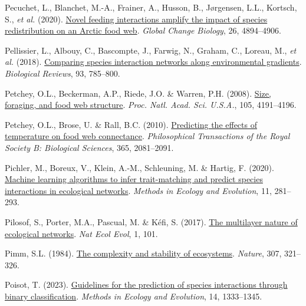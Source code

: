 \documentclass[
]{article}
\newlength{\cslhangindent}
\newenvironment{CSLReferences}[2] %
 {\begin{list}{}{%
  \setlength{\itemindent}{0pt}
  \setlength{\leftmargin}{0pt}
  \setlength{\parsep}{0pt}
  \ifodd #1
   \setlength{\leftmargin}{\cslhangindent}
   \setlength{\itemindent}{-1\cslhangindent}
  \fi
  \setlength{\itemsep}{#2\baselineskip}}}
 {\end{list}}
\begin{document}
\begin{CSLReferences}{1}{0}
Pecuchet, L., Blanchet, M.-A., Frainer, A., Husson, B., Jørgensen, L.L.,
Kortsch, S., \emph{et al.} (2020).
\href{https://doi.org/10.1111/gcb.15196}{Novel feeding interactions
amplify the impact of species redistribution on an {Arctic} food web}.
\emph{Global Change Biology}, 26, 4894--4906.

Pellissier, L., Albouy, C., Bascompte, J., Farwig, N., Graham, C.,
Loreau, M., \emph{et al.} (2018).
\href{https://doi.org/10.1111/brv.12366}{Comparing species interaction
networks along environmental gradients}. \emph{Biological Reviews}, 93,
785--800.

Petchey, O.L., Beckerman, A.P., Riede, J.O. \& Warren, P.H. (2008).
\href{https://doi.org/10.1073/pnas.0710672105}{Size, foraging, and food
web structure}. \emph{Proc. Natl. Acad. Sci. U.S.A.}, 105, 4191--4196.

Petchey, O.L., Brose, U. \& Rall, B.C. (2010).
\href{https://doi.org/10.1098/rstb.2010.0011}{Predicting the effects of
temperature on food web connectance}. \emph{Philosophical Transactions
of the Royal Society B: Biological Sciences}, 365, 2081--2091.

Pichler, M., Boreux, V., Klein, A.-M., Schleuning, M. \& Hartig, F.
(2020). \href{https://doi.org/10.1111/2041-210X.13329}{Machine learning
algorithms to infer trait-matching and predict species interactions in
ecological networks}. \emph{Methods in Ecology and Evolution}, 11,
281--293.

Pilosof, S., Porter, M.A., Pascual, M. \& Kéfi, S. (2017).
\href{https://doi.org/10.1038/s41559-017-0101}{The multilayer nature of
ecological networks}. \emph{Nat Ecol Evol}, 1, 101.

Pimm, S.L. (1984). \href{https://doi.org/10.1038/307321a0}{The
complexity and stability of ecosystems}. \emph{Nature}, 307, 321--326.

Poisot, T. (2023).
\href{https://doi.org/10.1111/2041-210X.14071}{Guidelines for the
prediction of species interactions through binary classification}.
\emph{Methods in Ecology and Evolution}, 14, 1333--1345.


\end{CSLReferences}
\end{document}
